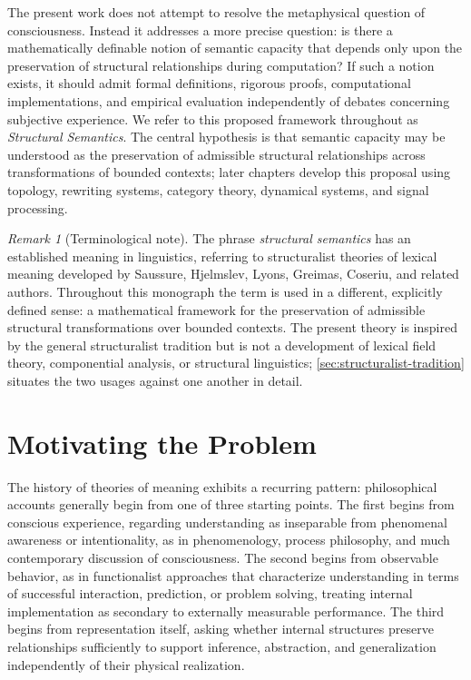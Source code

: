 \documentclass[11pt,twoside,openright]{book}
\numberwithin{equation}{chapter}
\theoremstyle{definition}
\theoremstyle{plain}
\theoremstyle{remark}
\newtheorem{remark}[definition]{Remark}
\theoremstyle{definition}
\begin{document}
The present work does not attempt to resolve the metaphysical question of
consciousness. Instead it addresses a more precise question: is there a
mathematically definable notion of semantic capacity that depends only
upon the preservation of structural relationships during computation? If
such a notion exists, it should admit formal definitions, rigorous proofs,
computational implementations, and empirical evaluation independently of
debates concerning subjective experience. We refer to this proposed
framework throughout as \emph{Structural Semantics}. The central
hypothesis is that semantic capacity may be understood as the preservation
of admissible structural relationships across transformations of bounded
contexts; later chapters develop this proposal using topology, rewriting
systems, category theory, dynamical systems, and signal processing.

\begin{remark}[Terminological note]
\label{sec:terminological-note}
The phrase \emph{structural semantics} has an established meaning in
linguistics, referring to structuralist theories of lexical meaning
developed by Saussure, Hjelmslev, Lyons, Greimas, Coseriu, and related
authors. Throughout this monograph the term is used in a different,
explicitly defined sense: a mathematical framework for the preservation of
admissible structural transformations over bounded contexts. The present
theory is inspired by the general structuralist tradition but is not a
development of lexical field theory, componential analysis, or structural
linguistics; \cref{sec:structuralist-tradition} situates the two usages
against one another in detail.
\end{remark}

\section{Motivating the Problem}

The history of theories of meaning exhibits a recurring pattern:
philosophical accounts generally begin from one of three starting points.
The first begins from conscious experience, regarding understanding as
inseparable from phenomenal awareness or intentionality, as in
phenomenology, process philosophy, and much contemporary discussion of
consciousness. The second begins from observable behavior, as in
functionalist approaches that characterize understanding in terms of
successful interaction, prediction, or problem solving, treating internal
implementation as secondary to externally measurable performance. The
third begins from representation itself, asking whether internal
structures preserve relationships sufficiently to support inference,
abstraction, and generalization independently of their physical
realization.
\end{document}

